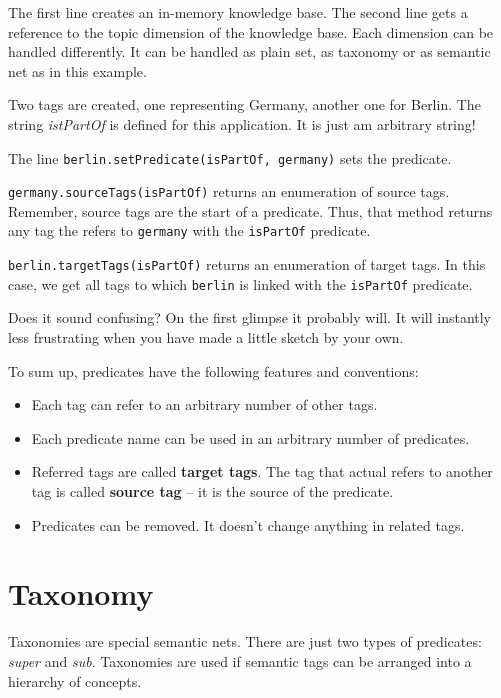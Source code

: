 The first line creates an in-memory knowledge base. The second line
gets a reference to the topic dimension of the knowledge base. Each dimension can be handled differently. It can be handled as plain set, as taxonomy or as semantic net as in this example.

Two tags are created, one representing Germany, another one for Berlin. The string {\it istPartOf} is defined for this application. It is just am arbitrary string! 

The line {\verb|berlin.setPredicate(isPartOf, germany)|} sets the predicate. 

{\verb|germany.sourceTags(isPartOf)|} returns an enumeration of source tags.
Remember, source tags are the start of a predicate. Thus, that method returns any tag the refers to {\tt germany} with the {\tt isPartOf} predicate.

{\verb|berlin.targetTags(isPartOf)|} returns an enumeration of target tags.
In this case, we get all tags to which {\tt berlin} is linked with the {\tt isPartOf} predicate.

Does it sound confusing? On the first glimpse it probably will. It will instantly less frustrating when you have made a little sketch by your own.

To sum up, predicates have the following features and conventions:

\begin{itemize}

\item Each tag can refer to an arbitrary number of other tags. 

\item
Each predicate name can be used in an arbitrary number of predicates.

\item
Referred tags are called {\bf target tags}. The tag that actual refers to another tag is called {\bf source tag} -- it is the source of the predicate.

\item
Predicates can be removed. It doesn't change anything in related tags.

\end{itemize}

\section{Taxonomy}
Taxonomies are special semantic nets. There are just two types of predicates:
{\it super} and {\it sub}. Taxonomies are used if semantic tags can be arranged into a hierarchy of concepts.

